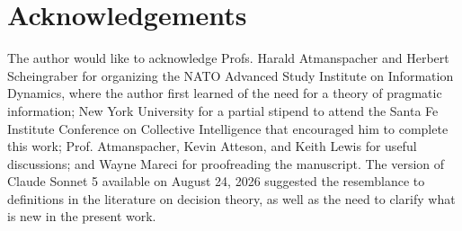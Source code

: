 \documentclass[11pt]{article}
\begin{document}
\section*{Acknowledgements}
The author would like to acknowledge Profs. Harald Atmanspacher and Herbert Scheingraber for organizing the NATO Advanced Study Institute on Information Dynamics, where the author first learned of the 
need for a theory of pragmatic information; New York University for a partial stipend to attend the Santa Fe Institute
Conference on Collective Intelligence that encouraged him to complete this work; Prof. Atmanspacher, Kevin Atteson, and Keith Lewis for useful discussions; and Wayne Mareci for proofreading the manuscript.
The version of Claude Sonnet 5 available on August 24, 2026 suggested the resemblance to definitions in the literature on decision theory, as well as the need to clarify what is new in the present work.
\end{document}
